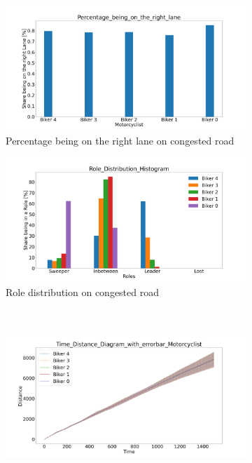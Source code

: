 \begin{figure}[H]
    \centering
    \begin{subfigure}[b]{0.45\textwidth}
        \centering
        \includegraphics[width=1.0\textwidth]{images/Rippoldsauer/Rippoldsauer_Percentage_being_on_the_right_lane_congested.png}
        \caption{Percentage being on the right lane on congested road}
    \end{subfigure}
    \hfill
    \begin{subfigure}[b]{0.45\textwidth}
        \centering
        \includegraphics[width=1.0\textwidth]{images/Rippoldsauer/Rippoldsauer_Role_Distribution_Histogram_congested.png}
        \caption{Role distribution on congested road}
    \end{subfigure}
    \\
    \begin{subfigure}[b]{0.45\textwidth}
        \centering
        \includegraphics[width=1.0\textwidth]{images/Rippoldsauer/Rippoldsauer_Time_Distance_Diagram_with_errorbar_congested.png}

\end{subfigure}
\end{figure}
